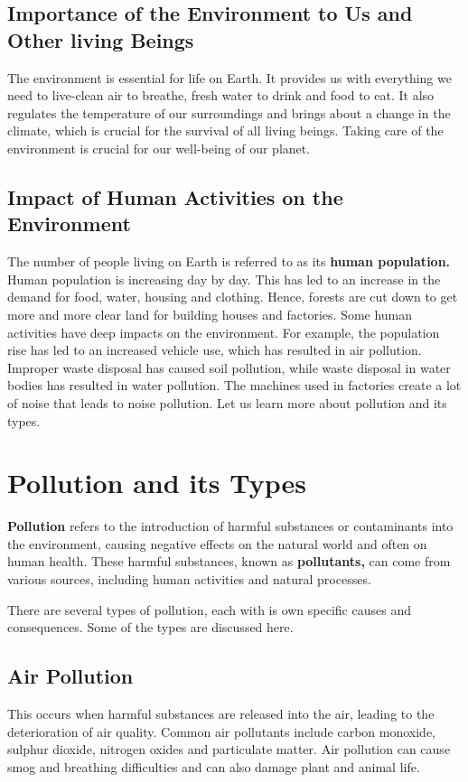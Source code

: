 \subsection{Importance of the Environment to Us and Other living Beings}
The environment is essential for life on Earth. It provides us with everything we need to live-clean air to breathe, fresh water to drink and food to eat. It also regulates the temperature of our surroundings and brings about a change in the climate, which is crucial for the survival of all living beings.
\vspace{0.1in}
Taking care of the environment is crucial for our well-being of our planet.
\subsection{Impact of Human Activities on the Environment}
The number of people living on Earth is referred to as its \textbf{human population.} Human population is increasing day by day. This has led to an increase in the demand for food, water, housing and clothing. Hence, forests are cut down to get more and more clear land for building houses and factories. Some human activities have deep impacts on the environment. For example, the population rise has led to an increased vehicle use, which has resulted in air pollution. Improper waste disposal has caused soil pollution, while waste disposal in water bodies has resulted in water pollution. The machines used in factories create a lot of noise that leads to noise pollution. Let us learn more about pollution and its types.
\section{Pollution and its Types}
\textbf{Pollution} refers to the introduction of harmful substances or contaminants into the environment, causing negative effects on the natural world and often on human health. These harmful substances, known as \textbf{pollutants,} can come from various sources, including human activities and natural processes.
\vspace{0.1in}
\par
There are several types of pollution, each with is own specific causes and consequences. Some of the types are discussed here.
\subsection{Air Pollution}
This occurs when harmful substances are released into the air, leading to the deterioration of air quality. Common air pollutants include carbon monoxide, sulphur dioxide, nitrogen oxides and particulate matter. Air pollution can cause smog and breathing difficulties and can also damage plant and animal life.
